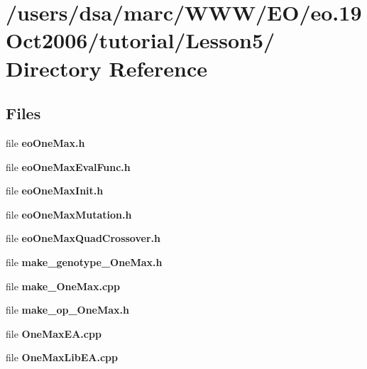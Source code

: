 \section{/users/dsa/marc/WWW/EO/eo.19Oct2006/tutorial/Lesson5/ Directory Reference}
\label{dir_000016}
\subsection*{Files}
\begin{CompactItemize}
\item 
file {\bf eoOneMax.h}
\item 
file {\bf eoOneMaxEvalFunc.h}
\item 
file {\bf eoOneMaxInit.h}
\item 
file {\bf eoOneMaxMutation.h}
\item 
file {\bf eoOneMaxQuadCrossover.h}
\item 
file {\bf make_genotype_OneMax.h}
\item 
file {\bf make_OneMax.cpp}
\item 
file {\bf make_op_OneMax.h}
\item 
file {\bf OneMaxEA.cpp}
\item 
file {\bf OneMaxLibEA.cpp}
\end{CompactItemize}
